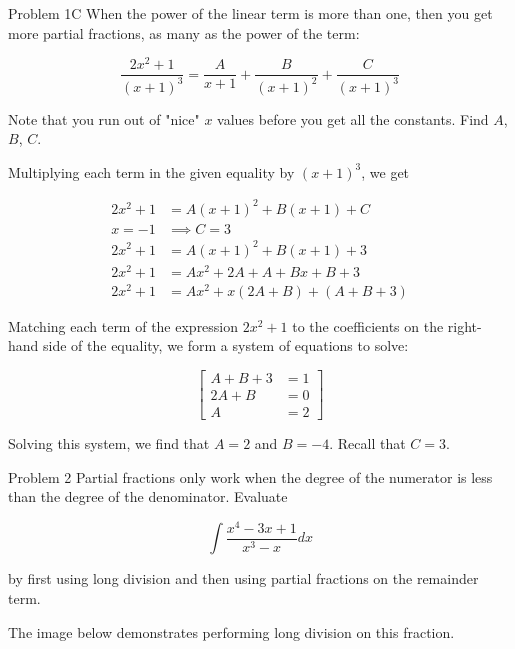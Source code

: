 \documentclass{article}
\begin{document}
    \begin{tbhtheorem}{Problem 1C}
        When the power of the linear term is more than one, then you get more partial fractions, as many as the power of the term:

        \[
            \frac{2x^2+1}{(x+1)^3} = \frac{A}{x+1} + \frac{B}{(x+1)^2} + \frac{C}{(x+1)^3}
        \]

        Note that you run out of "nice" $x$ values before you get all the constants. Find $A$, $B$, $C$.
    \end{tbhtheorem}

    Multiplying each term in the given equality by $(x+1)^3$, we get

    \begin{align*}
        2x^2 + 1    &= A(x+1)^2 + B(x+1) + C \\
        x = -1      &\implies C = 3 \\
        2x^2 + 1    &= A(x+1)^2 + B(x+1) + 3 \\
        2x^2 + 1    &= Ax^2 + 2A + A + Bx + B + 3 \\
        2x^2 + 1    &= Ax^2 + x(2A + B) + (A+ B + 3)
    \end{align*}

    Matching each term of the expression $2x^2+1$ to the coefficients on the right-hand side of the equality, we form a system of equations to solve:

    \[
        \begin{bmatrix*}
            A + B + 3 &= 1 \\
            2A + B    &= 0 \\
            A         &= 2
        \end{bmatrix*}
    \]

    Solving this system, we find that $A=2$ and $B=-4$. Recall that $C=3$.

    \pagebreak
    \thispagestyle{3}


    \begin{tbhtheorem}{Problem 2}
        Partial fractions only work when the degree of the numerator is less than the degree of the denominator. Evaluate

        \[
            \int \frac{x^4 - 3x+1}{x^3-x}dx
        \]

        by first using long division and then using partial fractions on the remainder term.
    \end{tbhtheorem}

    The image below demonstrates performing long division on this fraction.
    
\end{document}
